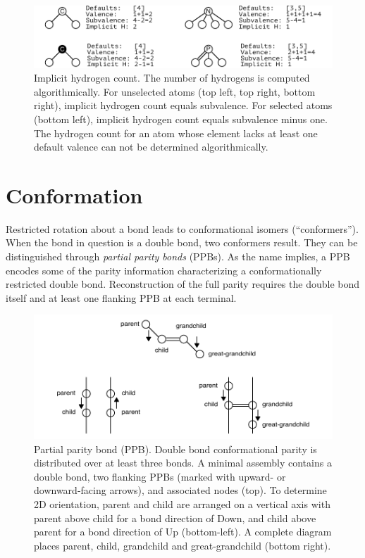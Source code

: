 \documentclass{article}
\begin{document}
\begin{figure}
    \centering
    \includegraphics[width=\columnwidth]{implicit-hydrogen-count.pdf}
    \caption{Implicit hydrogen count. The number of hydrogens is computed algorithmically. For unselected atoms (top left, top right, bottom right), implicit hydrogen count equals subvalence. For selected atoms (bottom left), implicit hydrogen count equals subvalence minus one. The hydrogen count for an atom whose element lacks at least one default valence can not be determined algorithmically.}
    \label{fig:implicit-hydrogen-count}
\end{figure}

\section*{Conformation}
\label{conformation}

Restricted rotation about a bond leads to conformational isomers (\enquote{conformers}). When the bond in question is a double bond, two conformers result. They can be distinguished through \textit{partial parity bonds} (PPBs). As the name implies, a PPB encodes some of the parity information characterizing a conformationally restricted double bond. Reconstruction of the full parity requires the double bond itself and at least one flanking PPB at each terminal.

\begin{figure}
    \centering
    \includegraphics[width=\columnwidth]{partial-parity-bond.pdf}
    \caption{Partial parity bond (PPB). Double bond conformational parity is distributed over at least three bonds. A minimal assembly contains a double bond, two flanking PPBs (marked with upward- or downward-facing arrows), and associated nodes (top). To determine 2D orientation, parent and child are arranged on a vertical axis with parent above child for a bond direction of Down, and child above parent for a bond direction of Up (bottom-left). A complete diagram places parent, child, grandchild and great-grandchild (bottom right).}
    \label{fig:partial-parity-bonds}
\end{figure}
\end{document}
